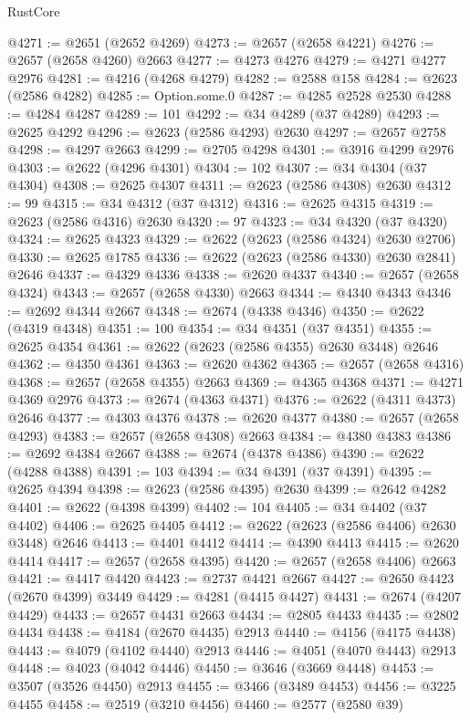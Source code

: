 \begin{lexlean}{RustCore}
\begin{coremodule}
@4271 := @2651 (@2652 @4269)
@4273 := @2657 (@2658 @4221)
@4276 := @2657 (@2658 @4260) @2663
@4277 := @4273 @4276
@4279 := @4271 @4277 @2976
@4281 := @4216 (@4268 @4279)
@4282 := @2588 @158
@4284 := @2623 (@2586 @4282)
@4285 := Option.some.{0}
@4287 := @4285 @2528 @2530
@4288 := @4284 @4287
@4289 := 101
@4292 := @34 @4289 (@37 @4289)
@4293 := @2625 @4292
@4296 := @2623 (@2586 @4293) @2630
@4297 := @2657 @2758
@4298 := @4297 @2663
@4299 := @2705 @4298
@4301 := @3916 @4299 @2976
@4303 := @2622 (@4296 @4301)
@4304 := 102
@4307 := @34 @4304 (@37 @4304)
@4308 := @2625 @4307
@4311 := @2623 (@2586 @4308) @2630
@4312 := 99
@4315 := @34 @4312 (@37 @4312)
@4316 := @2625 @4315
@4319 := @2623 (@2586 @4316) @2630
@4320 := 97
@4323 := @34 @4320 (@37 @4320)
@4324 := @2625 @4323
@4329 := @2622 (@2623 (@2586 @4324) @2630 @2706)
@4330 := @2625 @1785
@4336 := @2622 (@2623 (@2586 @4330) @2630 @2841) @2646
@4337 := @4329 @4336
@4338 := @2620 @4337
@4340 := @2657 (@2658 @4324)
@4343 := @2657 (@2658 @4330) @2663
@4344 := @4340 @4343
@4346 := @2692 @4344 @2667
@4348 := @2674 (@4338 @4346)
@4350 := @2622 (@4319 @4348)
@4351 := 100
@4354 := @34 @4351 (@37 @4351)
@4355 := @2625 @4354
@4361 := @2622 (@2623 (@2586 @4355) @2630 @3448) @2646
@4362 := @4350 @4361
@4363 := @2620 @4362
@4365 := @2657 (@2658 @4316)
@4368 := @2657 (@2658 @4355) @2663
@4369 := @4365 @4368
@4371 := @4271 @4369 @2976
@4373 := @2674 (@4363 @4371)
@4376 := @2622 (@4311 @4373) @2646
@4377 := @4303 @4376
@4378 := @2620 @4377
@4380 := @2657 (@2658 @4293)
@4383 := @2657 (@2658 @4308) @2663
@4384 := @4380 @4383
@4386 := @2692 @4384 @2667
@4388 := @2674 (@4378 @4386)
@4390 := @2622 (@4288 @4388)
@4391 := 103
@4394 := @34 @4391 (@37 @4391)
@4395 := @2625 @4394
@4398 := @2623 (@2586 @4395) @2630
@4399 := @2642 @4282
@4401 := @2622 (@4398 @4399)
@4402 := 104
@4405 := @34 @4402 (@37 @4402)
@4406 := @2625 @4405
@4412 := @2622 (@2623 (@2586 @4406) @2630 @3448) @2646
@4413 := @4401 @4412
@4414 := @4390 @4413
@4415 := @2620 @4414
@4417 := @2657 (@2658 @4395)
@4420 := @2657 (@2658 @4406) @2663
@4421 := @4417 @4420
@4423 := @2737 @4421 @2667
@4427 := @2650 @4423 (@2670 @4399) @3449
@4429 := @4281 (@4415 @4427)
@4431 := @2674 (@4207 @4429)
@4433 := @2657 @4431 @2663
@4434 := @2805 @4433
@4435 := @2802 @4434
@4438 := @4184 (@2670 @4435) @2913
@4440 := @4156 (@4175 @4438)
@4443 := @4079 (@4102 @4440) @2913
@4446 := @4051 (@4070 @4443) @2913
@4448 := @4023 (@4042 @4446)
@4450 := @3646 (@3669 @4448)
@4453 := @3507 (@3526 @4450) @2913
@4455 := @3466 (@3489 @4453)
@4456 := @3225 @4455
@4458 := @2519 (@3210 @4456)
@4460 := @2577 (@2580 @39)

\end{coremodule}
\end{lexlean}
